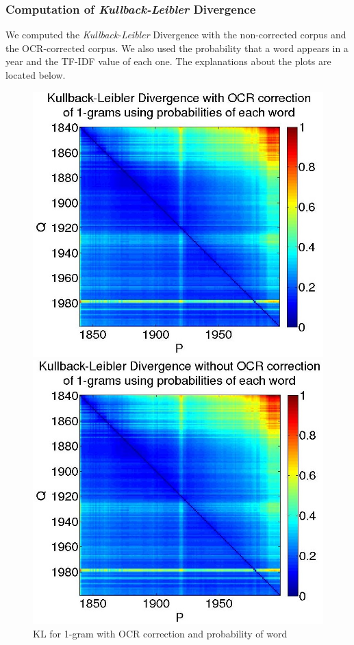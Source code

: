 \subsubsection{Computation of \emph{Kullback-Leibler} Divergence}
We computed the \emph{Kullback-Leibler} Divergence with the non-corrected corpus and the OCR-corrected corpus. We also used the probability that a word appears in a year and the TF-IDF value of each one. The explanations about the plots are located below.

\begin{figure}[H]
    \begin{minipage}[b]{0.48\linewidth}
        \includegraphics[scale=0.25]{Pictures/kullback-leibler/KL_1-grams_with_correction_proba.jpg}
        \caption{KL for 1-gram with OCR correction and probability of word}
        \label{KL-PC1}
    \end{minipage}\hfill
    \begin{minipage}[b]{0.5\linewidth}
        \includegraphics[scale=0.25]{Pictures/kullback-leibler/KL_1-grams_without_correction_proba.jpg}

\end{minipage}
\end{figure}
